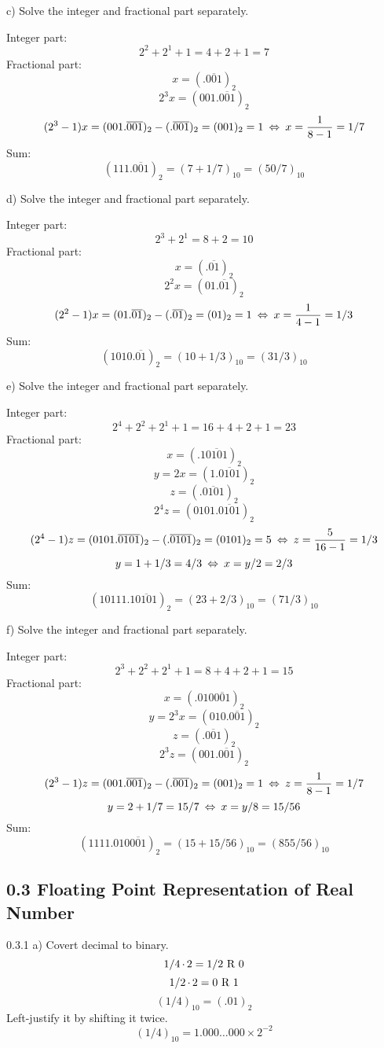 \begin{task}{c)}
Solve the integer and fractional part separately.

Integer part:
\[2^2+2^1+1=4+2+1=7\]
Fractional part:
\[x=(.\overline{001})_2\]
\[2^3x=(001.\overline{001})_2\]
\[(2^3-1)x=(001.\overline{001})_2-(.\overline{001})_2=(001)_2=1\lra 
x= \dfrac{1}{8-1}=1/7\]
Sum:
\[(111.\overline{001})_2=(7+1/7)_{10}=(50/7)_{10}\]
\end{task}

\begin{task}{d)}
Solve the integer and fractional part separately.

Integer part:
\[2^3+2^1=8+2=10\]
Fractional part:
\[x=(.\overline{01})_2\]
\[2^2x=(01.\overline{01})_2\]
\[(2^2-1)x=(01.\overline{01})_2-(.\overline{01})_2=(01)_2=1\lra 
x= \dfrac{1}{4-1}=1/3\]
Sum:
\[(1010.\overline{01})_2=(10+1/3)_{10}=(31/3)_{10}\]
\end{task}

\begin{task}{e)}
Solve the integer and fractional part separately.

Integer part:
\[2^4+2^2+2^1+1=16+4+2+1=23\]
Fractional part:
\[x=(.1\overline{0101})_2\]
\[y=2x=(1.\overline{0101})_2\]
\[z=(.\overline{0101})_2\]
\[2^4z=(0101.\overline{0101})_2\]
\[(2^4-1)z=(0101.\overline{0101})_2-(.\overline{0101})_2=(0101)_2=5\lra 
z= \dfrac{5}{16-1}=1/3\]
\[y=1+1/3=4/3\lra x = y/2 = 2/3\]
Sum:
\[(10111.1\overline{0101})_2=(23+2/3)_{10}=(71/3)_{10}\]
\end{task}

\begin{task}{f)}
Solve the integer and fractional part separately.

Integer part:
\[2^3+2^2+2^1+1=8+4+2+1=15\]
Fractional part:
\[x=(.010\overline{001})_2\]
\[y=2^3x=(010.\overline{001})_2\]
\[z=(.\overline{001})_2\]
\[2^3z=(001.\overline{001})_2\]
\[(2^3-1)z=(001.\overline{001})_2-(.\overline{001})_2=(001)_2=1\lra 
z= \dfrac{1}{8-1}=1/7\]
\[y=2+1/7=15/7\lra x = y/8 = 15/56\]
Sum:
\[(1111.010\overline{001})_2=(15+15/56)_{10}=(855/56)_{10}\]
\end{task}

\subsection*{0.3 Floating Point Representation of Real Number}

\begin{task}{0.3.1 a)}
Covert decimal to binary.
\[1/4\operatorname{\cdot}2=1/2\text{ R }0\]
\[1/2\operatorname{\cdot}2=0\text{ R }1\]
\[(1/4)_{10}=(.01)_2\]
Left-justify it by shifting it twice.
\[(1/4)_{10}=1.000\ldots000 \times 2^{-2}\]
\end{task}

